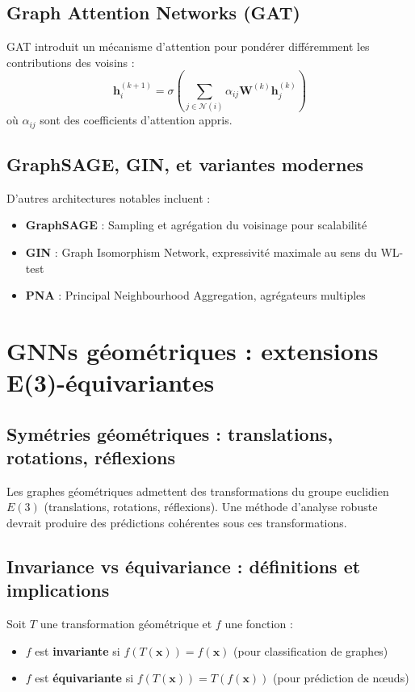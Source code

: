 \subsection{Graph Attention Networks (GAT)}

GAT introduit un mécanisme d'attention pour pondérer différemment les contributions des voisins :
\[
\mathbf{h}_i^{(k+1)} = \sigma\left(\sum_{j \in \mathcal{N}(i)} \alpha_{ij} \mathbf{W}^{(k)}\mathbf{h}_j^{(k)}\right)
\]
où $\alpha_{ij}$ sont des coefficients d'attention appris.

\subsection{GraphSAGE, GIN, et variantes modernes}

D'autres architectures notables incluent :
\begin{itemize}
    \item \textbf{GraphSAGE} : Sampling et agrégation du voisinage pour scalabilité
    \item \textbf{GIN} : Graph Isomorphism Network, expressivité maximale au sens du WL-test
    \item \textbf{PNA} : Principal Neighbourhood Aggregation, agrégateurs multiples
\end{itemize}

\section{GNNs géométriques : extensions E(3)-équivariantes}

\subsection{Symétries géométriques : translations, rotations, réflexions}

Les graphes géométriques admettent des transformations du groupe euclidien $E(3)$ (translations, rotations, réflexions). Une méthode d'analyse robuste devrait produire des prédictions cohérentes sous ces transformations.

\subsection{Invariance vs équivariance : définitions et implications}

Soit $T$ une transformation géométrique et $f$ une fonction :
\begin{itemize}
    \item $f$ est \textbf{invariante} si $f(T(\mathbf{x})) = f(\mathbf{x})$ (pour classification de graphes)
    \item $f$ est \textbf{équivariante} si $f(T(\mathbf{x})) = T(f(\mathbf{x}))$ (pour prédiction de nœuds)
\end{itemize}

